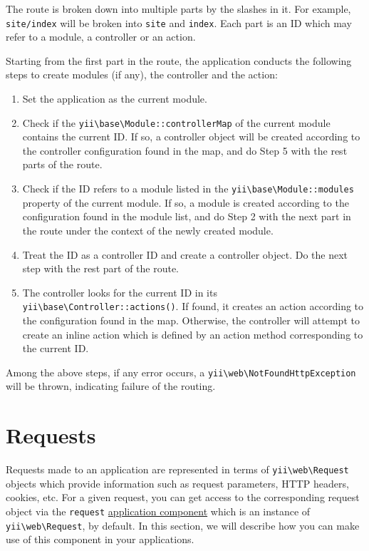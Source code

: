 The route is broken down into multiple parts by the slashes in it. For example, \lstinline|site/index| will be
broken into \lstinline|site| and \lstinline|index|. Each part is an ID which may refer to a module, a controller or an action.

Starting from the first part in the route, the application conducts the following steps to create modules (if any),
the controller and the action:

\begin{enumerate}
\item Set the application as the current module.
\item Check if the \texttt{yii{\allowbreak{}\textbackslash}base{\allowbreak{}\textbackslash}Module\allowbreak{}::\allowbreak{}controllerMap} of the current module contains the current ID.
If so, a controller object will be created according to the controller configuration found in the map,
and do Step 5 with the rest parts of the route.
\item Check if the ID refers to a module listed in the \texttt{yii{\allowbreak{}\textbackslash}base{\allowbreak{}\textbackslash}Module\allowbreak{}::\allowbreak{}modules} property of
the current module. If so, a module is created according to the configuration found in the module list,
and do Step 2 with the next part in the route under the context of the newly created module.
\item Treat the ID as a controller ID and create a controller object. Do the next step with the rest part of
the route.
\item The controller looks for the current ID in its \texttt{yii{\allowbreak{}\textbackslash}base{\allowbreak{}\textbackslash}Controller\allowbreak{}::\allowbreak{}actions()}. If found,
it creates an action according to the configuration found in the map. Otherwise, the controller will
attempt to create an inline action which is defined by an action method corresponding to the current ID.
\end{enumerate}
Among the above steps, if any error occurs, a \texttt{yii{\allowbreak{}\textbackslash}web{\allowbreak{}\textbackslash}NotFoundHttpException} will be thrown, indicating
failure of the routing.



\label{runtime-requests.md}\section{Requests}
Requests made to an application are represented in terms of \texttt{yii{\allowbreak{}\textbackslash}web{\allowbreak{}\textbackslash}Request} objects which provide information
such as request parameters, HTTP headers, cookies, etc. For a given request, you can get access to the corresponding
request object via the \lstinline|request| \hyperref[structure-application-components.md]{application component} which is an instance
of \texttt{yii{\allowbreak{}\textbackslash}web{\allowbreak{}\textbackslash}Request}, by default. In this section, we will describe how you can make use of this component in your applications.

